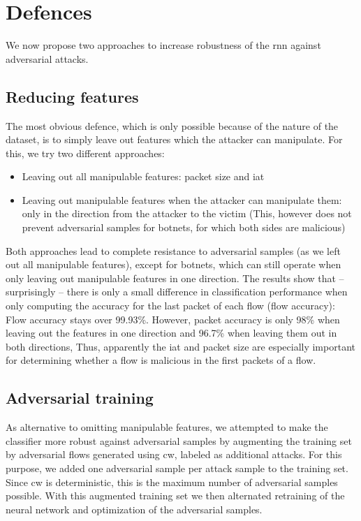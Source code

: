 \documentclass[conference]{IEEEtran}
\begin{document}
\section{Defences}
We now propose two approaches to increase robustness of the \gls{rnn} against adversarial attacks.
\subsection{Reducing features}
The most obvious defence, which is only possible because of the nature of the dataset, is to simply leave out features which the attacker can manipulate. For this, we try two different approaches:
\begin{itemize}[topsep=0pt,wide,labelwidth=!,labelindent=0pt]
\item Leaving out all manipulable features: packet size and \gls{iat}
\item Leaving out manipulable features when the attacker can manipulate them: only in the direction from the attacker to the victim (This, however does not prevent adversarial samples for botnets, for which both sides are malicious)
\end{itemize}

Both approaches lead to complete resistance to adversarial samples (as we left out all manipulable features), except for botnets, which can still operate when only leaving out manipulable features in one direction. The results show that -- surprisingly -- there is only a small difference in classification performance when only computing the accuracy for the last packet of each flow (flow accuracy): Flow accuracy stays over 99.93\%. However, packet accuracy is only 98\% when leaving out the features in one direction and 96.7\% when leaving them out in both directions, Thus, apparently the \gls{iat} and packet size are especially important for determining whether a flow is malicious in the first packets of a flow.

\subsection{Adversarial training}
As alternative to omitting manipulable features, we attempted to make the classifier more robust against adversarial samples by augmenting the training set by adversarial flows generated using  \gls{cw}, labeled as additional attacks.
For this purpose, we added one adversarial sample per attack sample to the training set. Since \gls{cw} is deterministic, this is the maximum number of adversarial samples possible. With this augmented training set we then alternated retraining of the neural network and optimization of the adversarial samples. %
\end{document}
